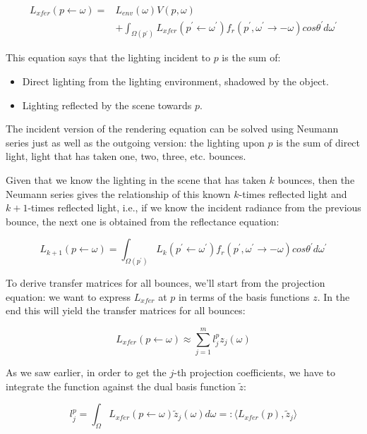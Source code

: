 \begin{equation*}
\begin{aligned}
	L_{xfer}(p\leftarrow\omega)=&L_{env}(\omega)V(p,\omega)\\
	&+\int_{\Omega (p^{'})}L_{xfer}(p^{'}\leftarrow\omega^{'})f_r(p^{'},\omega^{'}\to -\omega)cos\theta^{'}d\omega^{'}
\end{aligned}
\end{equation*}

This equation says that the lighting incident to $p$ is the sum of:

\begin{itemize}
	\item Direct lighting from the lighting environment, shadowed by the object.
	\item Lighting reflected by the scene towards $p$.
\end{itemize}

The incident version of the rendering equation can be solved using Neumann series just as well as the outgoing version: the lighting upon $p$ is the sum of direct light, light that has taken one, two, three, etc. bounces.

Given that we know the lighting in the scene that has taken $k$ bounces, then the Neumann series gives the relationship of this known $k$-times reflected light and $k+1$-times reflected light, i.e., if we know the incident radiance from the previous bounce, the next one is obtained from the reflectance equation:

\begin{equation*}
	L_{k+1}(p\leftarrow\omega)=\int_{\Omega (p^{'})}L_k(p^{'}\leftarrow\omega^{'})f_r(p^{'},\omega^{'}\to -\omega)cos\theta^{'}d\omega^{'}
\end{equation*}

To derive transfer matrices for all bounces, we'll start from the projection equation: we want to express $L_{xfer}$ at $p$ in terms of the basis functions $z$. In the end this will yield the transfer matrices for all bounces:

\begin{equation*}
	L_{xfer}(p\leftarrow\omega)\approx\sum^{m}_{j=1}l^{p}_jz_j(\omega)
\end{equation*}

As we saw earlier, in order to get the $j$-th projection coefficients, we have to integrate the function against the dual basis function $\tilde{z}$:

\begin{equation*}
	l_j^{p}=\int_\Omega L_{xfer}(p\leftarrow\omega)\tilde{z}_j(\omega)d\omega=:\langle L_{xfer}(p),\tilde{z}_j\rangle
\end{equation*}

